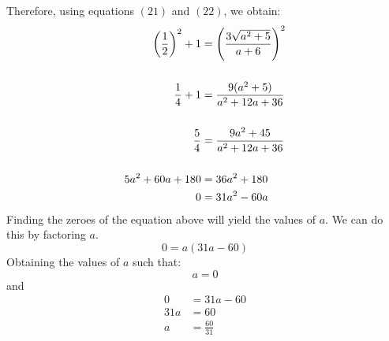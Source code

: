 \documentclass[hidelinks, a4paper, 12pt]{article}
\newcommand{\n}{\\[\baselineskip]}
\begin{document}
            Therefore, using equations $(21)$ and $(22)$, we obtain:
            \[\begin{split}
                \left(\frac{1}{2}\right)^2 + 1 &= \left(\frac{3\sqrt{a^2 + 5}}{a+6}\right)^2\n
                \frac{1}{4} + 1 &= \frac{9(a^2 + 5)}{a^2 + 12a + 36}\n
                \frac{5}{4} &= \frac{9a^2 + 45}{a^2 + 12a + 36}\n
                5a^2 + 60a + 180 &= 36a^2 + 180\\
                0 &= 31a^2 - 60a
            \end{split}\]
            Finding the zeroes of the equation above will yield the values of $a$. We can do this by factoring $a$.
            \[0 = a(31a - 60)\]
            Obtaining the values of $a$ such that:
            \[a = 0\]
            and
            \[\begin{split}
                0 &= 31a - 60\\
                31a &= 60\\
                a &= \frac{60}{31}
            \end{split}\]
    
    
\end{document}

